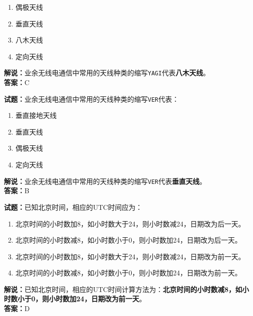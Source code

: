 \documentclass{ctexbook}
\begin{document}
\begin{enumerate}[leftmargin=3em]
  \item 偶极天线
  \item 垂直天线
  \item 八木天线
  \item 定向天线
\end{enumerate}

\noindent\textbf{解说：}业余无线电通信中常用的天线种类的缩写\texttt{YAGI}代表\textbf{八木天线}。\\\noindent\textbf{答案：}C

\vspace{\baselineskip}

\noindent\textbf{试题：}业余无线电通信中常用的天线种类的缩写\texttt{VER}代表：

\begin{enumerate}[leftmargin=3em]
  \item 垂直接地天线
  \item 垂直天线
  \item 偶极天线
  \item 定向天线
\end{enumerate}

\noindent\textbf{解说：}业余无线电通信中常用的天线种类的缩写\texttt{VER}代表\textbf{垂直天线}。\\\noindent\textbf{答案：}B

\vspace{\baselineskip}

\noindent\textbf{试题：}已知北京时间，相应的UTC时间应为：

\begin{enumerate}[leftmargin=3em]
  \item 北京时间的小时数加8，如小时数大于24，则小时数减24，日期改为后一天。
  \item 北京时间的小时数减8，如小时数小于0，则小时数加24，日期改为后一天。
  \item 北京时间的小时数加8，如小时数大于24，则小时数减24，日期改为前一天。
  \item 北京时间的小时数减8，如小时数小于0，则小时数加24，日期改为前一天。
\end{enumerate}

\noindent\textbf{解说：}已知北京时间，相应的UTC时间计算方法为：\textbf{北京时间的小时数减8，如小时数小于0，则小时数加24，日期改为前一天}。\\\noindent\textbf{答案：}D

\vspace{\baselineskip}
\end{document}
